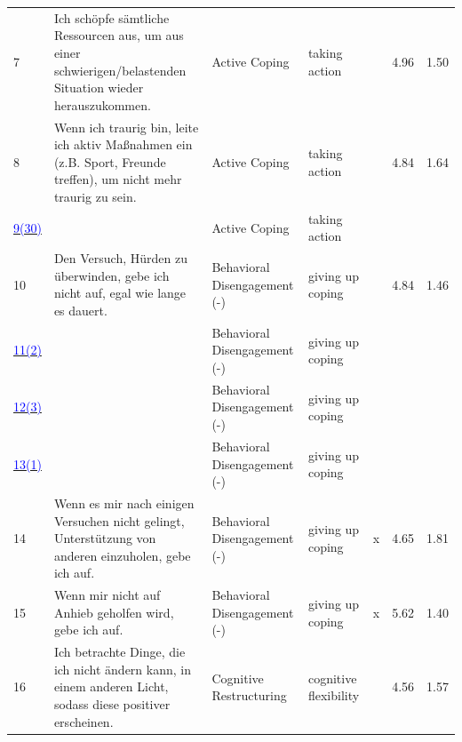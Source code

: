 \documentclass[
  man,floatsintext]{apa7}
\begin{document}
\begin{center}
\begin{ThreePartTable}
{\begin{longtable}{m{0.6cm}m{7.3cm}m{2.2cm}m{2.2cm}m{0.2cm}m{0.4cm}m{0.4cm}}
7 & Ich schöpfe sämtliche Ressourcen aus, um aus einer schwierigen/belastenden Situation wieder herauszukommen. & Active Coping & taking action &  & 4.96 & 1.50\\
8 & Wenn ich traurig bin, leite ich aktiv Maßnahmen ein (z.B. Sport, Freunde treffen), um nicht mehr traurig zu sein. & Active Coping & taking action &  & 4.84 & 1.64\\
\label{aktiv_1_180}\hyperref[table1]{\textcolor{blue}{9(30)}} & \cellcolor{lightgray}{Sollte die Unterstützung durch andere nicht zum gewünschten Erfolg führen, ziehe ich aktiv weitere Ressourcen zur Problembewältigung hinzu.} & Active Coping & taking action & \cellcolor{lightgray}{\ } & \cellcolor{lightgray}{4.94} & \cellcolor{lightgray}{1.48}\\
10 & Den Versuch, Hürden zu überwinden, gebe ich nicht auf, egal wie lange es dauert. & Behavioral Disengagement (-) & giving up coping &  & 4.84 & 1.46\\
\label{behav_1_129_r}\hyperref[table1]{\textcolor{blue}{11(2)}} & \cellcolor{lightgray}{Wenn sich etwas schwieriger gestaltet als gedacht, gebe ich auf.} & Behavioral Disengagement (-) & giving up coping & \cellcolor{lightgray}{x} & \cellcolor{lightgray}{5.06} & \cellcolor{lightgray}{1.53}\\
\label{behav_1_132_r}\hyperref[table1]{\textcolor{blue}{12(3)}} & \cellcolor{lightgray}{Mit der Zeit nehmen meine Bemühungen ab, mit meinen Problemen klarzukommen.} & Behavioral Disengagement (-) & giving up coping & \cellcolor{lightgray}{x} & \cellcolor{lightgray}{4.73} & \cellcolor{lightgray}{1.51}\\
\label{behav_1_133_r}\hyperref[table1]{\textcolor{blue}{13(1)}} & \cellcolor{lightgray}{Wenn mir nicht auf Anhieb geholfen wird, gebe ich mit der Sache auf.} & Behavioral Disengagement (-) & giving up coping & \cellcolor{lightgray}{x} & \cellcolor{lightgray}{5.56} & \cellcolor{lightgray}{1.43}\\
14 & Wenn es mir nach einigen Versuchen nicht gelingt, Unterstützung von anderen einzuholen, gebe ich auf. & Behavioral Disengagement (-) & giving up coping & x & 4.65 & 1.81\\
15 & Wenn mir nicht auf Anhieb geholfen wird, gebe ich auf. & Behavioral Disengagement (-) & giving up coping & x & 5.62 & 1.40\\
16 & Ich betrachte Dinge, die ich nicht ändern kann, in einem anderen Licht, sodass diese positiver erscheinen. & Cognitive Restructuring & cognitive flexibility &  & 4.56 & 1.57\\

\end{longtable}}
\end{ThreePartTable}
\end{center}
\end{document}
